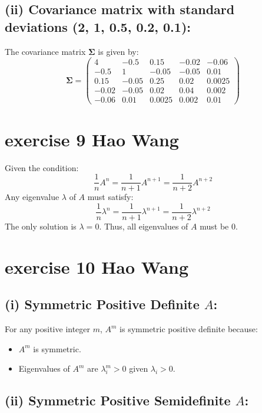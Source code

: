 \documentclass{article}
\let\normalSigma\Sigma
\renewcommand{\Sigma}{\bm{\normalSigma}} %
\begin{document}
\subsection*{(ii) Covariance matrix with standard deviations (2, 1, 0.5, 0.2, 0.1):}

The covariance matrix \(\Sigma\) is given by:
\[
    \Sigma = \begin{pmatrix}
        4     & -0.5  & 0.15   & -0.02 & -0.06  \\
        -0.5  & 1     & -0.05  & -0.05 & 0.01   \\
        0.15  & -0.05 & 0.25   & 0.02  & 0.0025 \\
        -0.02 & -0.05 & 0.02   & 0.04  & 0.002  \\
        -0.06 & 0.01  & 0.0025 & 0.002 & 0.01
    \end{pmatrix}
\]


\section{exercise 9 Hao Wang}

Given the condition:
\[
    \frac{1}{n}A^n = \frac{1}{n+1}A^{n+1} = \frac{1}{n+2}A^{n+2}
\]
Any eigenvalue \(\lambda\) of \(A\) must satisfy:
\[
    \frac{1}{n}\lambda^n = \frac{1}{n+1}\lambda^{n+1} = \frac{1}{n+2}\lambda^{n+2}
\]
The only solution is \(\lambda = 0\). Thus, all eigenvalues of \(A\) must be 0.


\section{exercise 10 Hao Wang}

\subsection*{(i) Symmetric Positive Definite \(A\):}

For any positive integer \(m\), \(A^m\) is symmetric positive definite because:
\begin{itemize}
    \item \(A^m\) is symmetric.
    \item Eigenvalues of \(A^m\) are \(\lambda_i^m > 0\) given \(\lambda_i > 0\).
\end{itemize}

\subsection*{(ii) Symmetric Positive Semidefinite \(A\):}
\end{document}
